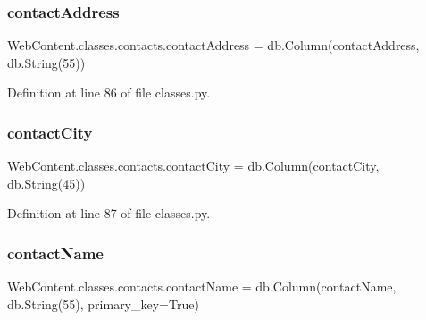 \subsubsection{\texorpdfstring{contact\+Address}{contactAddress}}
{\footnotesize\ttfamily Web\+Content.\+classes.\+contacts.\+contact\+Address = db.\+Column(\textquotesingle{}contact\+Address\textquotesingle{}, db.\+String(55))\hspace{0.3cm}{\ttfamily [static]}}



Definition at line 86 of file classes.\+py.

\mbox{\label{class_web_content_1_1classes_1_1contacts_ab337e819e9708c4385d88e19e5b4272a}} 
\subsubsection{\texorpdfstring{contact\+City}{contactCity}}
{\footnotesize\ttfamily Web\+Content.\+classes.\+contacts.\+contact\+City = db.\+Column(\textquotesingle{}contact\+City\textquotesingle{}, db.\+String(45))\hspace{0.3cm}{\ttfamily [static]}}



Definition at line 87 of file classes.\+py.

\mbox{\label{class_web_content_1_1classes_1_1contacts_af5b7ebdde96128f644dba2c9003395e1}} 
\subsubsection{\texorpdfstring{contact\+Name}{contactName}}
{\footnotesize\ttfamily Web\+Content.\+classes.\+contacts.\+contact\+Name = db.\+Column(\textquotesingle{}contact\+Name\textquotesingle{}, db.\+String(55), primary\+\_\+key=True)\hspace{0.3cm}{\ttfamily [static]}}



